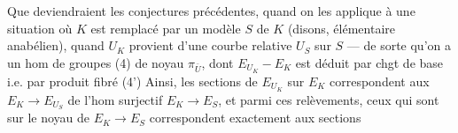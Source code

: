 Que deviendraient les conjectures précédentes, quand on les applique à une situation où $K$ est remplacé par un modèle $S$ de $K$ (disons, élémentaire anabélien), quand $U_K$ provient d'une courbe relative $U_S$ sur $S$ — de sorte qu'on a un hom de groupes
(4)\quad{}
de noyau $\pi_{\bar U}$, dont $E_{U_K}-E_K$ est déduit par chgt de base i.e. par produit fibré
(4')\quad{}
Ainsi, les sections de $E_{U_K}$ sur $E_K$ correspondent aux   $E_K\longrightarrow E_{U_S}$ de l'hom surjectif $E_K\longrightarrow E_S$, et parmi ces relèvements, ceux qui sont  sur le noyau de $E_K\longrightarrow E_S$ correspondent exactement aux sections
